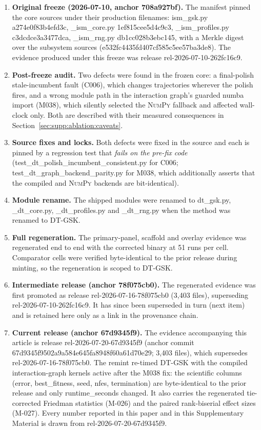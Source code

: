 \documentclass[algorithms,article,submit,moreauthors,pdftex]{Definitions/mdpi}
\newcommand{\dtgsk}{DT-GSK}
\begin{document}
\begin{enumerate}\itemsep2pt
\item \textbf{Original freeze (2026-07-10, anchor 708a927bf).}  The
  manifest pinned the core sources under their production filenames:
  ism\_gsk.py a274e0f83b4efd3c,
  \_ism\_core.py 1ef815cee5d4c9c3,
  \_ism\_profiles.py c3dcdce3a3477dca,
  \_ism\_rng.py db1cc028b3ebc145, with a Merkle digest over
  the subsystem sources (e532fc4435fd407cf585c5ee57ba3de8).  The evidence
  produced under this freeze was release rel-2026-07-10-262fc16c9.
\item \textbf{Post-freeze audit.}  Two defects were found in the frozen core: a
  final-polish stale-incumbent fault (C006), which changes trajectories wherever
  the polish fires, and a wrong module path in the interaction graph's guarded
  numba import (M038), which silently selected the \textsc{NumPy}
  fallback and affected wall-clock only.  Both are described with their measured
  consequences in Section~\ref{sec:supp:ablation:caveats}.
\item \textbf{Source fixes and locks.}  Both defects were fixed in the source and
  each is pinned by a regression test that \emph{fails on the pre-fix code}
  (test\_dt\_polish\_incumbent\_consistent.py for C006;
  test\_dt\_graph\_backend\_parity.py for M038, which additionally
  asserts that the compiled and \textsc{NumPy} backends are bit-identical).
\item \textbf{Module rename.}  The shipped modules were renamed to
  dt\_gsk.py, \_dt\_core.py, \_dt\_profiles.py and
  \_dt\_rng.py when the method was renamed to \dtgsk{}.
\item \textbf{Full regeneration.}  The primary-panel, scaffold and overlay
  evidence was regenerated end to end with the corrected binary at 51 runs per
  cell.  Comparator cells were verified byte-identical to the prior release
  during minting, so the regeneration is scoped to \dtgsk{}.
\item \textbf{Intermediate release (anchor 78f075cb0).}  The regenerated
  evidence was first promoted as release rel-2026-07-16-78f075cb0
  (3{,}403 files), superseding rel-2026-07-10-262fc16c9.  It has since
  been superseded in turn (next item) and is retained here only as a link in the
  provenance chain.
\item \textbf{Current release (anchor 67d9345f9).}  The evidence
  accompanying this article is release rel-2026-07-20-67d9345f9 (anchor
  commit 67d9345f9502a9a584e645fa8948f60a61d70e29; 3{,}403 files), which
  supersedes rel-2026-07-16-78f075cb0.  The remint re-timed \dtgsk{} with
  the compiled interaction-graph kernels active after the M038 fix: the scientific
  columns (error, best\_fitness, seed, nfes,
  termination) are byte-identical to the prior release and only
  runtime\_seconds changed.  It also carries the regenerated
  tie-corrected Friedman statistics (M-026) and the paired rank-biserial effect
  sizes (M-027).  Every number reported in this paper and in this Supplementary
  Material is drawn from rel-2026-07-20-67d9345f9.
\end{enumerate}
\end{document}
